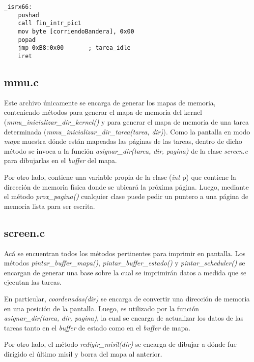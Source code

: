 \documentclass[a4paper]{article}
\newenvironment{codesnippet}{%
	\begin{Sbox}\begin{minipage}{\textwidth}\sffamily\small}%
	{\end{minipage}\end{Sbox}%
		\begin{center}%
		\vspace{-0.4cm}\colorbox{litegrey}{\TheSbox}\end{center}\vspace{0.3cm}}
\begin{document}
\begin{codesnippet}
\begin{verbatim}
_isrx66:
    pushad
    call fin_intr_pic1
    mov byte [corriendoBandera], 0x00
    popad
    jmp 0xB8:0x00       ; tarea_idle
    iret
\end{verbatim}
\end{codesnippet}

\subsection{mmu.c}
Este archivo únicamente se encarga de generar los mapas de memoria, conteniendo métodos para generar el mapa de memoria del kernel (\textit{mmu_inicializar_dir_kernel()} y para generar el mapa de memoria de una tarea determinada (\textit{mmu_inicializar_dir_tarea(tarea, dir)}). Como la pantalla en modo \textit{mapa} muestra dónde están mapeadas las páginas de las tareas, dentro de dicho método se invoca a la función \textit{asignar_dir(tarea, dir, pagina)} de la clase \textit{screen.c} para dibujarlas en el \textit{buffer} del mapa.

Por otro lado, contiene una variable propia de la clase (\textit{int} p) que contiene la dirección de memoria física donde se ubicará la próxima página. Luego, mediante el método \textit{prox_pagina()} cualquier clase puede pedir un puntero a una página de memoria lista para ser escrita. 

\subsection{screen.c}
Acá se encuentran todos los métodos pertinentes para imprimir en pantalla. Los métodos \textit{pintar_buffer_mapa()}, \textit{pintar_buffer_estado()} y \textit{pintar_scheduler()} se encargan de generar una base sobre la cual se imprimirán datos a medida que se ejecutan las tareas.


En particular, \textit{coordenadas(dir)} se encarga de convertir una dirección de memoria en una posición de la pantalla. Luego, es utilizado por la función \textit{asignar_dir(tarea, dir, pagina)}, la cual se encarga de actualizar los datos de las tareas tanto en el \textit{buffer} de estado como en el \textit{buffer} de mapa.

Por otro lado, el método \textit{redigir_misil(dir)} se encarga de dibujar a dónde fue dirigido el último misil y borra del mapa al anterior.
\\
\end{document}
